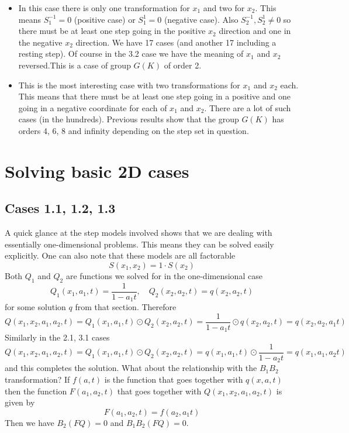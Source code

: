 \documentclass[12pt]{article}
\theoremstyle{definition} \newtheorem{definition}[theorem]{Definition}
\begin{document}
\begin{itemize}
\item[Case 2.3:] In this case there is only one transformation for $x_1$ and two for $x_2$. This means $S_1^{-1} = 0$ (positive case) or $S_1^{1} = 0$ (negative case). Also $S_2^{-1}, S_2^1 \neq 0$ so there must be at least one step going in the positive $x_2$ direction and one in the negative $x_2$ direction. We have 17 cases (and another 17 including a resting step). Of course in the 3.2 case we have the meaning of $x_1$ and $x_2$ reversed.This is a case of group $G(K)$ of order 2.
\item[Case 3.3:] This is the most interesting case with two transformations for $x_1$ and $x_2$ each. This means that there must be at least one step going in a positive and one going in a negative coordinate for each of $x_1$ and $x_2$. There are a lot of such cases (in the hundreds). Previous results show that the group $G(K)$ has orders 4, 6, 8 and infinity depending on the step set in question.
 \end{itemize}

\section{Solving basic 2D cases}

\subsection{Cases 1.1, 1.2, 1.3}
A quick glance at the step models involved shows that we are dealing with essentially one-dimensional problems. This means they can be solved easily explicitly. One can also note that these models are all factorable
\[
	S(x_1,x_2) = 1\cdot S(x_2)
\]
Both $Q_1$ and $Q_2$ are functions we solved for in the one-dimensional case
\[
	Q_1(x_1,a_1,t) = \frac{1}{1-a_1 t},\quad Q_2(x_2,a_2,t) = q(x_2,a_2,t)
\]
for some solution $q$ from that section. Therefore
\[
	Q(x_1,x_2,a_1,a_2,t) = Q_1(x_1,a_1,t) \odot Q_2(x_2,a_2,t) = \frac{1}{1-a_1 t}\odot q(x_2,a_2,t) = q(x_2,a_2,a_1 t)
\]
Similarly in the 2.1, 3.1 cases
\[
	Q(x_1,x_2,a_1,a_2,t) = Q_1(x_1,a_1,t) \odot Q_2(x_2,a_2,t) =  q(x_1,a_1,t) \odot \frac{1}{1-a_2 t}= q(x_1,a_1,a_2 t)
\]
and this completes the solution. What about the relationship with the $B_1B_2$ transformation? If $f(a,t)$ is the function that goes together with $q(x,a,t)$ then the function $F(a_1,a_2,t)$ that goes together with $Q(x_1,x_2,a_1,a_2,t)$ is given by
\[
	F(a_1,a_2,t) = f(a_2,a_1 t)
\]
Then we have $B_2 (FQ) = 0$ and $B_1B_2(FQ) = 0$.
\end{document}
